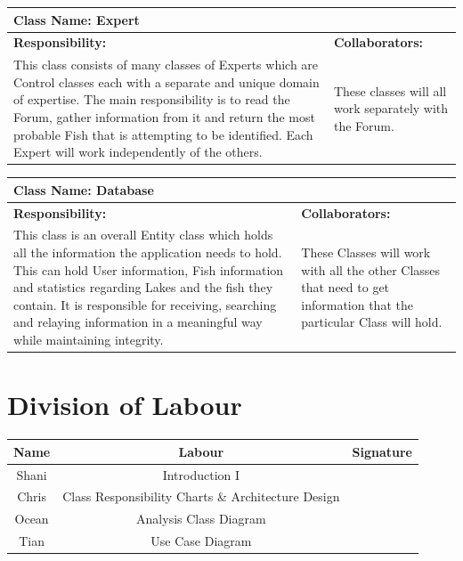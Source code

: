 \documentclass[]{article}
\begin{document}
	\begin{table}[ht]
		\centering
		\begin{tabular}{|p{5cm}|p{5cm}|}
		\hline
		 \multicolumn{2}{|l|}{\textbf{Class Name: Expert}} \\
		\hline
		\textbf{Responsibility:} & \textbf{Collaborators:} \\ \hline
		This class consists of many classes of Experts which are Control classes each with a separate and unique domain of expertise. The main responsibility is to read the Forum, gather information from it and return the most probable Fish that is attempting to be identified. Each Expert will work independently of the others. & These classes will all work separately with the Forum. \\
		\hline
		\end{tabular}
	\end{table}

	\begin{table}[ht]
		\centering
		\begin{tabular}{|p{5cm}|p{5cm}|}
		\hline
		 \multicolumn{2}{|l|}{\textbf{Class Name: Database}} \\
		\hline
		\textbf{Responsibility:} & \textbf{Collaborators:} \\
		\hline
		This class is an overall Entity class which holds all the information the application needs to hold. This can hold User information, Fish information and statistics regarding Lakes and the fish they contain. It is responsible for receiving, searching and relaying information in a meaningful way while maintaining integrity. & These Classes will work with all the other Classes that need to get information that the particular Class will hold. \\
		\hline
		\end{tabular}
	\end{table}

\FloatBarrier

\appendix
\section{Division of Labour}
\label{sec:division_of_labour}
\begin{center}
\begin{tabular}{ |c|c|c| }
 \hline
 Name & Labour & Signature              \\ \hline
 Shani & Introduction I & \\
 Chris & Class Responsibility Charts \& Architecture Design &  \\
 Ocean & Analysis Class Diagram &  \\
 Tian & Use Case Diagram & \\
 \hline
\end{tabular}
\end{center}

\newpage

\listoffigures
\end{document}
